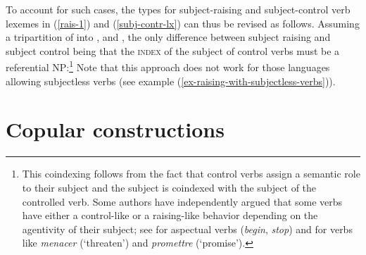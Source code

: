 \largerpage
\noindent
To account for such cases, the types for subject-raising and subject-control verb lexemes in
(\ref{rais-1}) and (\ref{subj-contr-lx}) can thus be revised  as follows. 
Assuming a tripartition of  into ,  and 
\citep[]{ps2}, 
the only difference between subject raising and subject control being that the \textsc{index} of the subject of control verbs must be a
referential NP:\footnote{This coindexing follows from the fact that control verbs assign a semantic role to their
subject and the subject is coindexed with the subject of the controlled verb. Some authors have independently argued that some verbs have either a control-like or a raising-like behavior depending on the agentivity of their subject; see  for  aspectual verbs (\emph{begin}, \emph{stop}) and  for  verbs like \emph{menacer} (`threaten') and \emph{promettre} (`promise').}
\eal
\ex {}  \impl {} 
\ex {} \impl \avm{ [\argst < \NPi, \ldots, [xarg & [ind & $i$ ]  ] > ] }
\zl
Note that this approach does not work for those languages allowing subjectless verbs (see example (\ref{ex-raising-with-subjectless-verbs})).

\section{Copular constructions}
\label{sec-copular-constructions}

